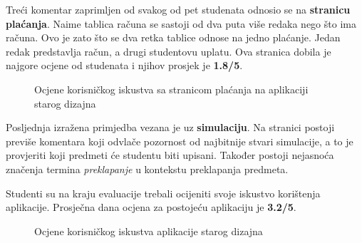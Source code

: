 \documentclass[times, utf8, zavrsni, numeric]{fer}
\begin{document}
        Treći komentar zaprimljen od svakog od pet studenata odnosio se na \textbf{stranicu plaćanja}. Naime tablica računa se sastoji od dva puta više redaka nego što ima računa. Ovo je zato što se dva retka tablice odnose na jedno plaćanje. Jedan redak predstavlja račun, a drugi studentovu uplatu. Ova stranica dobila je najgore ocjene od studenata i njihov prosjek je \textbf{1.8/5}.
        
        \begin{figure} [H]
          \centering
          \caption{Ocjene korisničkog iskustva sa stranicom plaćanja na aplikaciji starog dizajna}
        \end{figure}
        
        Posljednja izražena primjedba vezana je uz \textbf{simulaciju}. Na stranici postoji previše komentara koji odvlače pozornost od najbitnije stvari simulacije, a to je provjeriti koji predmeti će studentu biti upisani. Također postoji nejasnoća značenja termina \textit{preklapanje} u kontekstu preklapanja predmeta.
        
        Studenti su na kraju evaluacije trebali ocijeniti svoje iskustvo korištenja aplikacije. Prosječna dana ocjena za postojeću aplikaciju je \textbf{3.2/5}.
        
        \begin{figure} [H]
          \centering
          \caption{Ocjene korisničkog iskustva aplikacije starog dizajna}
        \end{figure}
        
\end{document}
